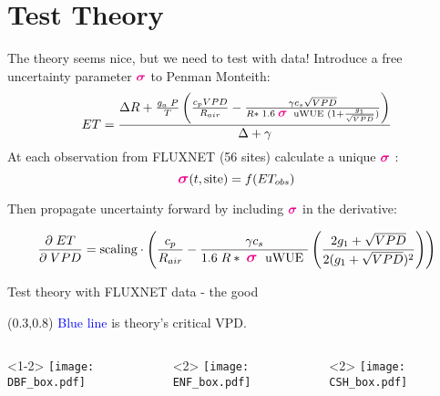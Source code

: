 \documentclass[aspectratio=169]{beamer}
\begin{document}
\section{Test Theory}
\begin{frame}{The theory seems nice, but we need to test with data!}
  Introduce a free uncertainty parameter \Large $\textcolor{magenta}{\boldsymbol{\sigma}}$ \normalsize to Penman Monteith:
  \[ET = \frac{\Delta R + \frac{g_a\; P}{T} \left( \frac{ c_p VPD}{R_{air}} -  \frac{\gamma c_s \sqrt{VPD} }{ R* \; 1.6\; \textcolor{magenta}{\boldsymbol{\mathlarger{\mathlarger{\sigma}}}} \; \text{ uWUE } (1 + \frac{g_1}{\sqrt{VPD}})} \right) }{ \Delta + \gamma}\]
  At each observation from FLUXNET (56 sites) calculate a unique \Large $\textcolor{magenta}{\boldsymbol{\sigma}}$ \normalsize:
  \[\textcolor{magenta}{\boldsymbol{\mathlarger{\sigma}}}(t, \text{site}) = f(ET_{obs})\]

  Then propagate uncertainty forward by including \Large $\textcolor{magenta}{\boldsymbol{\sigma}}$ \normalsize in the derivative:

  \[\frac{\partial \;  ET}{\partial \; VPD} = \text{scaling} \cdot \left(\frac{ c_p}{R_{air}} -  \frac{\gamma c_s }{1.6 \; R*\; \textcolor{magenta}{\boldsymbol{\mathlarger{\mathlarger{\sigma}}}} \; \text{ uWUE }} \left( \frac{2 g_1 + \sqrt{VPD}}{2 (g_1 + \sqrt{VPD})^2}\right) \right)\]
\end{frame}

\begin{frame}{Test theory with FLUXNET data - the good}
  \begin{textblock*}{1.0\textwidth}(0.3\textwidth,0.8\textheight)
    \textcolor{blue}{Blue line} is theory's critical VPD.\\
  \end{textblock*}

  \begin{columns}
    \begin{column}{0.33\textwidth}<1-2>
      \texttt{[image: DBF\_box.pdf]}
    \end{column}
    \begin{column}{0.33\textwidth}<2>
      \texttt{[image: ENF\_box.pdf]}
    \end{column}
    \begin{column}{0.33\textwidth}<2>
      \texttt{[image: CSH\_box.pdf]}
    \end{column}
  \end{columns}
\end{frame}
\end{document}

